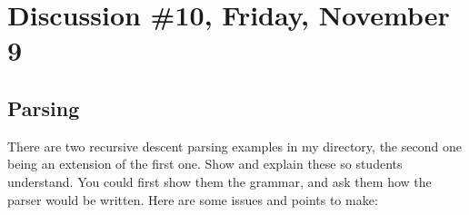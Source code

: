 \documentclass[12pt]{article}
\begin{document}

  \section{Discussion \#10, Friday, November 9}

    \subsection{Parsing}

      There are two recursive descent parsing examples in my directory, the
    second one being an extension of the first one.  Show and explain these
    so students understand.  You could first show them the grammar, and ask
    them how the parser would be written.  Here are some issues and points
    to make:
    
      \vspace{-1.5mm}
\end{document}
